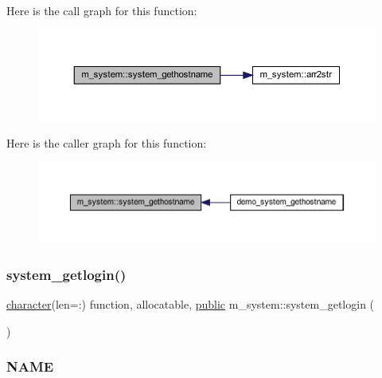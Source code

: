 Here is the call graph for this function\+:
\nopagebreak
\begin{figure}[H]
\begin{center}
\leavevmode
\includegraphics[width=350pt]{namespacem__system_a96fab225737afb77ff1cbba9866f0d05_cgraph}
\end{center}
\end{figure}
Here is the caller graph for this function\+:
\nopagebreak
\begin{figure}[H]
\begin{center}
\leavevmode
\includegraphics[width=350pt]{namespacem__system_a96fab225737afb77ff1cbba9866f0d05_icgraph}
\end{center}
\end{figure}
\mbox{\label{namespacem__system_a70f78645a1f130734005e190d469529d}} 
\subsubsection{\texorpdfstring{system\+\_\+getlogin()}{system\_getlogin()}}
{\footnotesize\ttfamily \hyperlink{option__stopwatch_83_8txt_abd4b21fbbd175834027b5224bfe97e66}{character}(len=\+:) function, allocatable, \hyperlink{M__stopwatch_83_8txt_a2f74811300c361e53b430611a7d1769f}{public} m\+\_\+system\+::system\+\_\+getlogin (\begin{DoxyParamCaption}{ }\end{DoxyParamCaption})}



\subsubsection*{N\+A\+ME}

